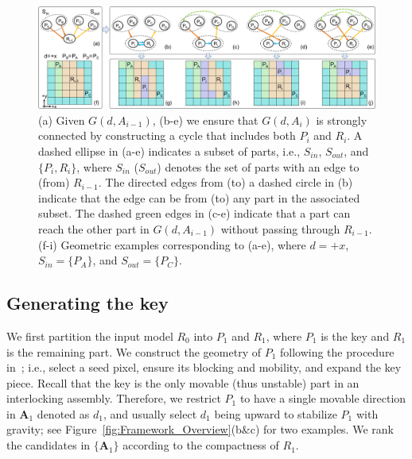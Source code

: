 \begin{figure}[!t]
	\centering
	\includegraphics[width=14.50cm]{images/Framework_Cycle.png}
	\vspace*{-2.5mm}
	\caption{
		(a) Given $G(d, A_{i-1})$, (b-e) we ensure that $G(d, A_i)$ is strongly connected by constructing a cycle that includes both $P_i$ and $R_i$.
		A dashed ellipse in (a-e) indicates a subset of parts, i.e., $S_{in}$, $S_{out}$, and $\{P_i, R_i\}$, where $S_{in}$ ($S_{out}$) denotes the set of parts with an edge to (from) $R_{i-1}$.
		The directed edges from (to) a dashed circle in (b) indicate that the edge can be from (to) any part in the associated subset.
		The dashed green edges in (c-e) indicate that a part can reach the other part in $G(d, A_{i-1})$ without passing through $R_{i-1}$.
		(f-i) Geometric examples corresponding to (a-e), where $d = +x$, $S_{in} = \{P_A\}$, and $S_{out} = \{P_C\}$.
	}
	\vspace*{-2.5mm}
	\label{fig:Framework_Cycle}
\end{figure}




\vspace*{-0.8mm}
\subsection{Generating the key}
\label{subsec:genKey}

We first partition the input model $R_0$ into $P_1$ and $R_1$, where $P_1$ is the key and $R_1$ is the remaining part.
We construct the geometry of $P_1$ following the procedure in~\cite{Song-2012-InterCubes}; i.e., select a seed pixel, ensure its blocking and mobility, and expand the key piece.
Recall that the key is the only movable (thus unstable) part in an interlocking assembly.
Therefore, we restrict $P_1$ to have a single movable direction in $\mathbf{A}_1$ denoted as $d_1$, and usually select $d_1$ being upward to stabilize $P_1$ with gravity; see Figure~\ref{fig:Framework_Overview}(b\&c) for two examples.
We rank the candidates in $\{\mathbf{A}_1\}$ according to the compactness of $R_1$.


